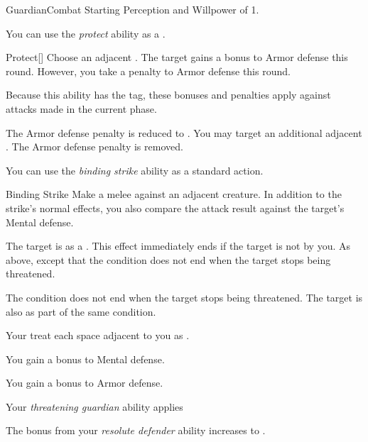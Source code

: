     \begin{feat}{Guardian}{Combat}
        \featpre Starting Perception and Willpower of 1.

         You can use the \textit{protect} ability as a .
        \begin{freeability}{Protect}[]
            Choose an adjacent .
            The target gains a  bonus to Armor defense this round.
            However, you take a  penalty to Armor defense this round.

            Because this ability has the  tag, these bonuses and penalties apply against attacks made in the current phase.

            \rankline
             The Armor defense penalty is reduced to .
             You may target an additional adjacent .
             The Armor defense penalty is removed.
        \end{freeability}

         You can use the \textit{binding strike} ability as a standard action.
        \begin{freeability}{Binding Strike}
            Make a melee  against an adjacent creature.
            In addition to the strike's normal effects, you also compare the attack result against the target's Mental defense.

            \hit The target is  as a .
            This effect immediately ends if the target is not  by you.
            \crit As above, except that the condition does not end when the target stops being threatened.

            \rankline
             The condition does not end when the target stops being threatened.
             The target is also  as part of the same condition.
        \end{freeability}

         Your  treat each space adjacent to you as .

         You gain a  bonus to Mental defense.

         You gain a  bonus to Armor defense.

         Your \textit{threatening guardian} ability applies 

         The bonus from your \textit{resolute defender} ability increases to .
    \end{feat}

